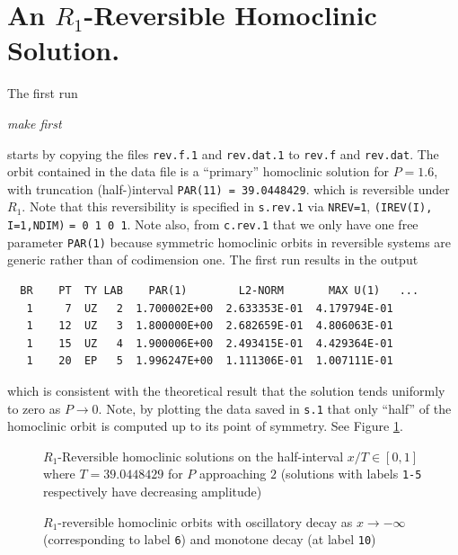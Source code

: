 \documentclass[12pt]{report}
\begin{document}
\section{An $R_1$-Reversible Homoclinic Solution.}

The first run
\begin{center}
\it make first
\end{center}
starts by 
copying the files {\tt rev.f.1} and {\tt rev.dat.1} to 
{\tt rev.f} and {\tt rev.dat}. The orbit contained in
the data file is a ``primary'' homoclinic solution for $P=1.6$, with
truncation (half-)interval {\tt PAR(11) = 39.0448429}.
which is reversible under $R_1$. Note that this reversibility is
specified in {\tt s.rev.1} via {\tt NREV=1}, 
{\tt (IREV(I), I=1,NDIM)} {\tt = 0 1 0 1}. Note also, from
{\tt c.rev.1} that we only have one free parameter {\tt PAR(1)}
because symmetric homoclinic orbits in reversible systems are
generic rather than of codimension one.
The first run  results in the output
\begin{verbatim}
  BR    PT  TY LAB    PAR(1)        L2-NORM       MAX U(1)   ...   
   1     7  UZ   2  1.700002E+00  2.633353E-01  4.179794E-01
   1    12  UZ   3  1.800000E+00  2.682659E-01  4.806063E-01
   1    15  UZ   4  1.900006E+00  2.493415E-01  4.429364E-01
   1    20  EP   5  1.996247E+00  1.111306E-01  1.007111E-01
\end{verbatim}
which is consistent with the theoretical result that the solution
tends uniformly to zero as $P\to 0$. Note, by plotting the data
saved in {\tt s.1} that only ``half'' of the 
homoclinic orbit is computed up to its point of symmetry. See Figure
\ref{Frev1}.

\begin{figure}[p]
\epsfysize 9.0cm
\centerline{}
\caption{$R_1$-Reversible homoclinic solutions on the half-interval
$x/T \in [0,1]$ where $T=39.0448429$ for $P$ approaching $2$ (solutions
with labels {\tt 1-5} respectively have decreasing amplitude)}
\label{Frev1}
\end{figure}
\begin{figure}[p]
\epsfysize 9.0cm
\centerline{}
\caption{$R_1$-reversible homoclinic orbits with oscillatory decay 
as $x \to -\infty$ (corresponding to label {\tt 6}) and monotone decay 
(at label {\tt 10})}
\label{Frev2}
\end{figure}
\end{document}

